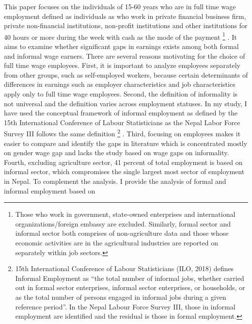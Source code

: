 This paper focuses on the individuals of 15-60 years who are in full time wage employment defined as individuals as who work in private financial business firm, private non-financial institutions, non-profit institutions and other institutions for 40 hours or more during the week with cash as the mode of the payment \footnote{Those who work in government, state-owned enterprises and international organizations/foreign embassy are excluded. Similarly, formal sector and informal sector both comprises of non-agriculture data and those whose economic activities are in the agricultural industries are reported on separately within job sectors.} . It aims to examine whether significant gaps in earnings exists among both formal and informal wage earners. There are several reasons motivating for the choice of full time wage employees. First, it is important to analyze employees separately from other groups, such as self-employed workers, because certain determinants of differences in earnings such as employer characteristics and job characteristics apply only to full time wage employees. Second, the definition of informality is not universal and the definition varies across employment statuses. In my study, I have used the conceptual framework of informal employment as defined by the 15th International Conference of Labour Statisticians as the Nepal Labor Force Survey III follows the same definition \footnote{15th International Conference of Labour Statisticians (ILO, 2018) defines Informal Employment as “the total number of informal jobs, whether carried out in formal sector enterprises, informal sector enterprises, or households, or as the total number of persons engaged in informal jobs during a given reference period”. In the Nepal Labour Force Survey III, those in informal employment are identified and the residual is those in formal employment.} . Third, focusing on employees makes it easier to compare and identify the gaps in literature which is concentrated mostly on gender wage gap and lacks the study based on wage gaps on informality. Fourth, excluding agriculture sector, 41 percent of total employment is based on informal sector, which compromises the single largest most sector of employment in Nepal. To complement the analysis. I provide the analysis of formal and informal employment based on 

